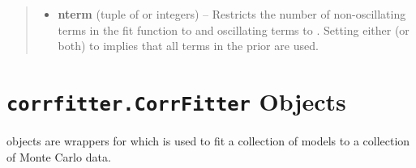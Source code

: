 \documentclass[letterpaper,10pt,english]{sphinxmanual}
\begin{document}
\begin{fulllineitems}
\begin{fulllineitems}
\begin{quote}
\begin{description}
\begin{itemize}
\item {} 
\textbf{nterm} (tuple of  or integers) -- Restricts the number of non-oscillating terms in the
fit function to  and oscillating terms to
. Setting either (or both) to  implies that
all terms in the prior are used.

\end{itemize}

\end{description}\end{quote}

\end{fulllineitems}


\end{fulllineitems}



\section{\texttt{corrfitter.CorrFitter} Objects}
\label{corrfitter:corrfitter-objects}
{\hyperref[corrfitter:corrfitter.CorrFitter]{}} objects are wrappers for  which
is used to fit a collection of models to a collection of Monte Carlo data.
\end{document}
